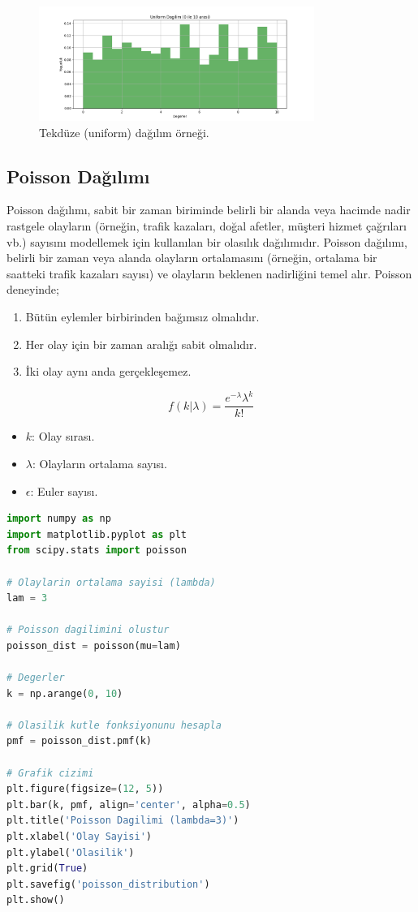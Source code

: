 \begin{figure}[h]
    \centering
    \includegraphics[width=0.8\textwidth]{images/uniform_distribution.png}
    \caption{Tekdüze (uniform) dağılım örneği.}
    \label{fig:enter-label}
\end{figure}


\subsection{Poisson Dağılımı}
Poisson dağılımı, sabit bir zaman biriminde belirli bir alanda veya hacimde nadir rastgele olayların (örneğin, trafik kazaları, doğal afetler, müşteri hizmet çağrıları vb.) sayısını modellemek için kullanılan bir olasılık dağılımıdır. Poisson dağılımı, belirli bir zaman veya alanda olayların ortalamasını (örneğin, ortalama bir saatteki trafik kazaları sayısı) ve olayların beklenen nadirliğini temel alır. Poisson deneyinde;

\begin{enumerate}
	\item Bütün eylemler birbirinden bağımsız olmalıdır.
	\item Her olay için bir zaman aralığı sabit olmalıdır.
	\item İki olay aynı anda gerçekleşemez.
\end{enumerate}

\[f(k|\lambda) = \frac{e^{-\lambda} \lambda^k}{k!}\]
\begin{itemize}
	\item $k$: Olay sırası.
	\item $\lambda$: Olayların ortalama sayısı.
	\item $\epsilon$: Euler sayısı.
\end{itemize}

\begin{lstlisting}[language=Python]
import numpy as np
import matplotlib.pyplot as plt
from scipy.stats import poisson

# Olaylarin ortalama sayisi (lambda)
lam = 3

# Poisson dagilimini olustur
poisson_dist = poisson(mu=lam)

# Degerler
k = np.arange(0, 10)

# Olasilik kutle fonksiyonunu hesapla
pmf = poisson_dist.pmf(k)

# Grafik cizimi
plt.figure(figsize=(12, 5))
plt.bar(k, pmf, align='center', alpha=0.5)
plt.title('Poisson Dagilimi (lambda=3)')
plt.xlabel('Olay Sayisi')
plt.ylabel('Olasilik')
plt.grid(True)
plt.savefig('poisson_distribution')
plt.show()
\end{lstlisting}

